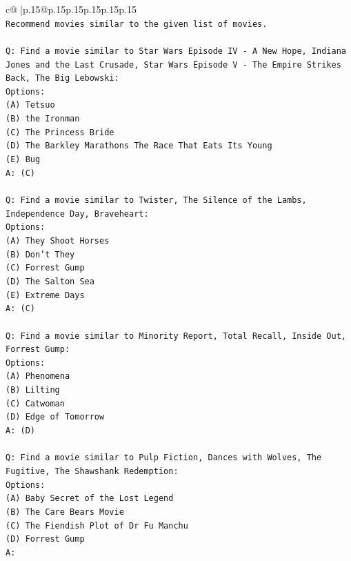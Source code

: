 \documentclass{article}
\begin{document}
{\begin{supertabular}{c@{$\;$}|p{.15\linewidth}@{}p{.15\linewidth}p{.15\linewidth}p{.15\linewidth}p{.15\linewidth}p{.15\linewidth}}
{{{\\ 
\texttt{Recommend movies similar to the given list of movies.} \\
\\ 
\texttt{Q: Find a movie similar to Star Wars Episode IV {-} A New Hope, Indiana Jones and the Last Crusade, Star Wars Episode V {-} The Empire Strikes Back, The Big Lebowski:} \\
\texttt{Options:} \\
\texttt{(A) Tetsuo} \\
\texttt{(B) the Ironman} \\
\texttt{(C) The Princess Bride} \\
\texttt{(D) The Barkley Marathons The Race That Eats Its Young} \\
\texttt{(E) Bug} \\
\texttt{A: (C)} \\
\\ 
\texttt{Q: Find a movie similar to Twister, The Silence of the Lambs, Independence Day, Braveheart:} \\
\texttt{Options:} \\
\texttt{(A) They Shoot Horses} \\
\texttt{(B) Don't They} \\
\texttt{(C) Forrest Gump} \\
\texttt{(D) The Salton Sea} \\
\texttt{(E) Extreme Days} \\
\texttt{A: (C)} \\
\\ 
\texttt{Q: Find a movie similar to Minority Report, Total Recall, Inside Out, Forrest Gump:} \\
\texttt{Options:} \\
\texttt{(A) Phenomena} \\
\texttt{(B) Lilting} \\
\texttt{(C) Catwoman} \\
\texttt{(D) Edge of Tomorrow} \\
\texttt{A: (D)} \\
\\ 
\texttt{Q: Find a movie similar to Pulp Fiction, Dances with Wolves, The Fugitive, The Shawshank Redemption:} \\
\texttt{Options:} \\
\texttt{(A) Baby Secret of the Lost Legend} \\
\texttt{(B) The Care Bears Movie} \\
\texttt{(C) The Fiendish Plot of Dr Fu Manchu} \\
\texttt{(D) Forrest Gump} \\
\texttt{A:} \\
            }
        }
    }
     \\ \\


\end{supertabular}}
\end{document}
